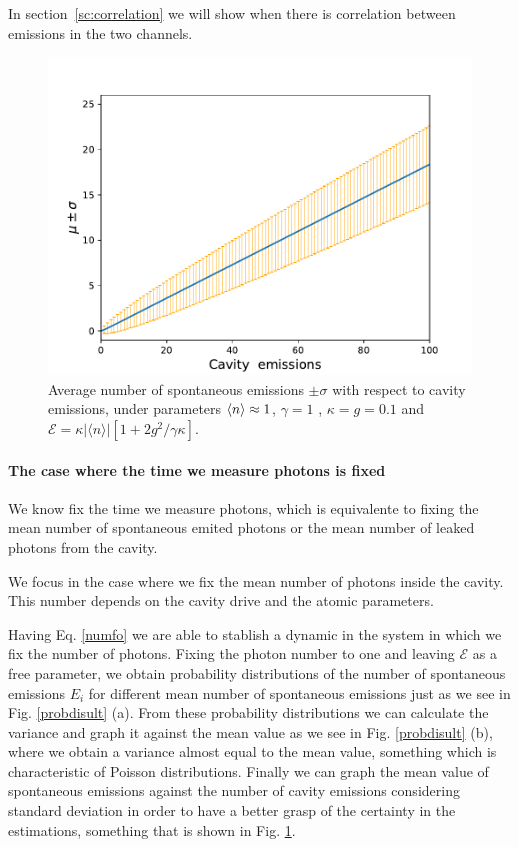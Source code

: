 \documentclass[%
 reprint,
 amsmath,amssymb,
 aps, 
]{revtex4-1}
\begin{document}
In section~\ref{sc:correlation} we will show
when there is correlation between emissions in the two channels.


\begin{figure}[!b]  
\centering
\includegraphics[scale = 0.5]{newsigmaengg.pdf}
\caption{\small{Average number of spontaneous emissions $\pm \sigma$ with respect to cavity emissions, under parameters $\expval{n} \approx 1$, $\gamma = 1$ , $\kappa = g = 0.1$ and $\mathcal{E} =  \kappa |\langle n \rangle|[1 + 2g^2/\gamma \kappa]$.}}
\label{graph}
\end{figure} 


\paragraph{The case where the time we measure photons is fixed}

We know fix the time we measure photons, which is equivalente to
fixing the mean number of spontaneous emited photons or the mean number
of leaked photons from the cavity. 

We focus in the case where we fix the mean number of photons inside
the cavity. This number depends on the cavity drive and the atomic
parameters.


Having Eq. \eqref{numfo} we are able to stablish a dynamic in the system in which we fix the number of photons. Fixing the photon number to one and leaving $\mathcal{E}$ as a free parameter, we obtain probability distributions of the number of spontaneous emissions $E_i$ for different mean number of spontaneous emissions just as we see in Fig. \ref{probdisult} (a). From these probability distributions we can calculate the variance and graph it against the mean value as we see in Fig. \ref{probdisult} (b), where we obtain a variance almost equal to the mean value, something which is characteristic of Poisson distributions. 
Finally we can graph the mean value of spontaneous emissions against the number of cavity emissions considering standard deviation in order to have a better grasp of the certainty in the estimations, something that is shown in Fig. \ref{graph}.
\end{document}
